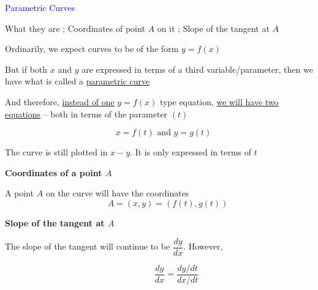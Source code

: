 \documentclass[14pt,fleqn]{extarticle}
\begin{document}
\textcolor{blue}{Parametric Curves}

What they are ; Coordinates of
point $A$ on it ; Slope of the tangent at $A$
%

\newcard

Ordinarily, we expect curves to
be of the form $y = f(x)$ \newline 

But if both $x$ and $y$ are expressed
in terms of a third variable/parameter,
then we have what is called a 
\underline{parametric curve}\newline 

And therefore, \underline{instead of one} $y = f(x)$ type equation,
\underline{we will have two equations} -- both in terms 
of the parameter $(t)$

\[ \quad x = f(t)  \text{ and }  y = g(t) \]

The curve is still plotted in $x-y$. It is only expressed in terms of $t$\newline 

 \textbf{Coordinates of a point $A$}\newline 
 
 A point $A$ on the curve will have 
 the coordinates 
 \[ \qquad A = (x,y) = \left(f(t), g(t) \right)\]

\textbf{Slope of the tangent at $A$}\newline
 
 The slope of the tangent will continue
 to be $\dfrac{dy}{dx}$. However, 

 \[ \qquad\qquad \dfrac{dy}{dx} = \frac{dy / dt}{dx / dt}\]
 
%
\end{document}
